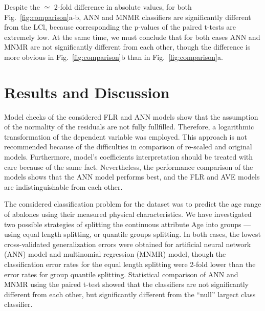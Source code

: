 \documentclass[10pt, paper=a4]{article}
\begin{document}
Despite the $\simeq$ 2-fold difference in absolute values, for both
Fig.~\ref{fig:comparison}a-b, ANN and MNMR classifiers are
significantly different from the LCl, because corresponding the
p-values of the paired t-tests are extremely low.  At the same time,
we must conclude that for both cases ANN and MNMR are not
significantly different from each other, though the difference is more
obvious in Fig.~\ref{fig:comparison}b than in
Fig.~\ref{fig:comparison}a.

\section{Results and Discussion}
\label{sec:results_and_discussion}

Model checks of the considered FLR and ANN models show that the
assumption of the normality of the residuals are not fully fullfilled.
Therefore, a logarithmic transformation of the dependent variable was
employed.  This approach is not recommended because of the
difficulties in comparison of re-scaled and original models.
Furthermore, model's coefficients interpretation should be treated
with care because of the same fact.  Nevertheless, the performance
comparison of the models shows that the ANN model performs best, and
the FLR and AVE models are indistinguishable from each other.

The considered classification problem for the dataset was to predict
the age range of abalones using their measured physical
characteristics.  We have investigated two possible strategies of
splitting the continuous attribute Age into groups --- using equal
length splitting, or quantile groups splitting.  In both cases, the
lowest cross-validated generalization errors were obtained for
artificial neural network (ANN) model and multinomial regression
(MNMR) model, though the classification error rates for the equal
length splitting were 2-fold lower than the error rates for group
quantile splitting.  Statistical comparison of ANN and MNMR using the
paired t-test showed that the classifiers are not significantly
different from each other, but significantly different from the
``null'' largect class classifier.


\end{document}
